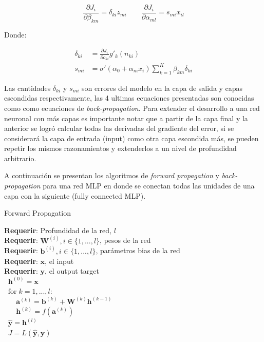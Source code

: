 \begin{equation}
	\frac{\partial J_i}{\partial \beta_{km}} = \delta_{ki}z_{mi}
	\quad\quad
	\frac{\partial J_i}{\partial \alpha_{ml}} = s_{mi}x_{il}
\end{equation}

Donde:

\begin{align}
\delta_{ki} &= 
\frac{\partial J_i}{\partial o_{ki}}
g'_k(n_{ki})\\
s_{mi} &= 
\sigma'(\alpha_0+\alpha_mx_i)\sum_{k=1}^K\beta_{km}\delta_{ki}
\end{align}

Las cantidades $\delta_{ki}$ y $s_{mi}$ son errores del modelo en la capa de salida y capas escondidas respectivamente, las 4 ultimas ecuaciones presentadas son conocidas como como ecuaciones de \textit{back-propagation}. Para extender el desarrollo a una red neuronal con más capas es importante notar que a partir de la capa final y la anterior se logró calcular todas las derivadas del gradiente del error, si se considerará la capa de entrada (input) como otra capa escondida más, se pueden repetir los mismos razonamientos y extenderlos a un nivel de profundidad arbitrario. 

A continuaci\'on se presentan los algoritmos de \textit{forward propagation} y \textit{back-propagation} para una red MLP en donde se conectan todas las unidades de una capa con la siguiente (fully connected MLP).

\begin{algorithm}[H] %
\caption{Forward Propagation}\label{ML:Algorithm1}
\textbf{Requerir}: Profundidad de la red, $l$ \\
\textbf{Requerir}: $\bm{W}^{(i)}, i \in \{1,...,l\}$, pesos de la red \\
\textbf{Requerir}: $\bm{b}^{(i)}, i \in \{1,...,l\}$, parámetros bias de la red \\
\textbf{Requerir}: $\bm{x}$, el input \\
\textbf{Requerir}: $\bm{y}$, el output target \\
$\;\;\bm{h}^{(0)} = \bm{x}$\\
$\;\; \textrm{for} \;k = 1,...,l$:\\
$\;\;\;\;\;\;\bm{a}^{(k)} = \bm{b}^{(k)} + \bm{W}^{(k)}\bm{h}^{(k-1)}$\\
$\;\;\;\;\;\;\bm{h}^{(k)} = f(\bm{a}^{(k)})$\\
$\;\;\bm{\hat{y}} = \bm{h}^{(l)}$\\
$\;\;J = L(\bm{\hat{y}},\bm{y})$
\end{algorithm}

